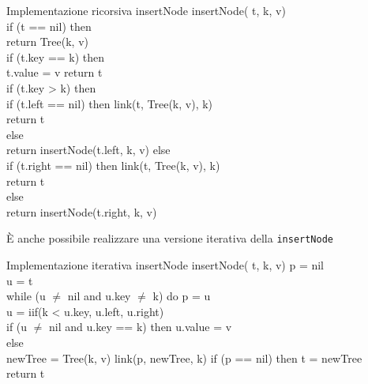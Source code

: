 \begin{minicode}{Implementazione ricorsiva insertNode}
   \ind{} insertNode( t,  k,  v)\\
        \indf if (t == nil) then\\
            return Tree(k, v)\\
        \indf if (t.key == k) then\\
            t.value = v\hfill{}
            return t\\
        \indf if (t.key > k) then\\
            \indff if (t.left == nil) then\hfill{}
                link(t, Tree(k, v), k)\\
                return t\\
            \indff else\\
                return insertNode(t.left, k, v)\hfill{}
        \indf else\\
            \indff if (t.right == nil) then\hfill{}
                link(t, Tree(k, v), k)\\
                return t\\
            \indff else\\
                return insertNode(t.right, k, v)\hfill{}
\end{minicode}\noindent
È anche possibile realizzare una versione iterativa della \texttt{insertNode}

\begin{minicode}{Implementazione iterativa insertNode}
\ind{} insertNode( t,  k,  v)\hfill{}
     p = nil\\
     u = t\\
    \indf while (u $\neq$ nil and u.key $\neq$ k) do\hfill{}
        p = u\\
        u = iif(k < u.key, u.left, u.right)\\
    \indf if (u $\neq$ nil and u.key == k) then\hfill{}
        u.value = v\\
    \indf else\\
         newTree = Tree(k, v)\hfill{}
        link(p, newTree, k)\hfill{}
        \indff if (p == nil) then\hfill{}
            t = newTree\\
    \indf return t\hfill{}
\end{minicode}

